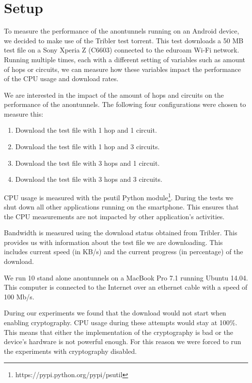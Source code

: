 % 
\section{Setup}
	\label{sec:experiments:approach}
	To measure the performance of the anontunnels running on an Android device, we decided to make use of the Tribler test torrent. This test downloads a 50 MB test file on a Sony Xperia Z (C6603)  connected to the eduroam Wi-Fi network. Running multiple times, each with a different setting of variables such as amount of hops or circuits, we can measure how these variables impact the performance of the CPU usage and download rates.
	
	We are interested in the impact of the amount of hops and circuits on the performance of the anontunnels. The following four configurations were chosen to measure this:
	
	\begin{enumerate}
		\item Download the test file with 1 hop and 1 circuit.
		\item Download the test file with 1 hop and 3 circuits.
		\item Download the test file with 3 hops and 1 circuit.
		\item Download the test file with 3 hops and 3 circuits.
	\end{enumerate}
	
	CPU usage is measured with the psutil Python module\footnote{https://pypi.python.org/pypi/psutil}. During the tests we shut down all other applications running on the smartphone. This ensures that the CPU measurements are not impacted by other application's activities.
	
	Bandwidth is measured using the download status obtained from Tribler. This provides us with information about the test file we are downloading. This includes current speed (in KB/s) and the current progress (in percentage) of the download.
	
	We run 10 stand alone anontunnels on a MacBook Pro 7.1 running Ubuntu 14.04. This computer is connected to the Internet over an ethernet cable with a speed of 100 Mb/s. 
	
	During our experiments we found that the download would not start when enabling cryptography. CPU usage during these attempts would stay at 100\%. This means that either the implementation of the cryptography is bad or the device's hardware is not powerful enough. For this reason we were forced to run the experiments with cryptography disabled.
	
